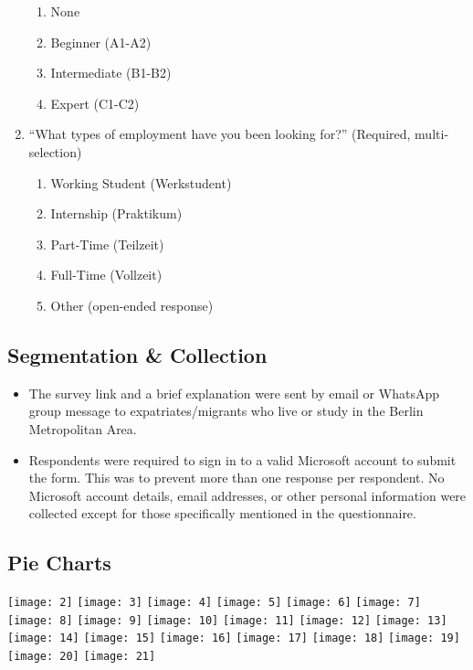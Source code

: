 \begin{enumerate}
\begin{enumerate}
		\item None
		\item Beginner (A1-A2)
		\item Intermediate (B1-B2)
		\item Expert (C1-C2)
	\end{enumerate}
	\item “What types of employment have you been looking for?” (Required, multi-selection)
	\begin{enumerate}
		\item Working Student (Werkstudent)
		\item Internship (Praktikum)
		\item Part-Time (Teilzeit)
		\item Full-Time (Vollzeit)
		\item Other (open-ended response)
	\end{enumerate}
\end{enumerate}

\subsection{Segmentation \& Collection}
\begin{itemize}
  \item The survey link and a brief explanation were sent by email or WhatsApp group message to expatriates/migrants who live or study in the Berlin Metropolitan Area.
  \item Respondents were required to sign in to a valid Microsoft account to submit the form. This was to prevent more than one response per respondent. No Microsoft account details, email addresses, or other personal information were collected except for those specifically mentioned in the questionnaire.
\end{itemize}

\subsection{Pie Charts}
\noindent
\centering
\texttt{[image: 2]}
\texttt{[image: 3]}
\texttt{[image: 4]}
\texttt{[image: 5]}
\texttt{[image: 6]}
\texttt{[image: 7]}
\texttt{[image: 8]}
\texttt{[image: 9]}
\texttt{[image: 10]}
\texttt{[image: 11]}
\texttt{[image: 12]}
\texttt{[image: 13]}
\texttt{[image: 14]}
\texttt{[image: 15]}
\texttt{[image: 16]}
\texttt{[image: 17]}
\texttt{[image: 18]}
\texttt{[image: 19]}
\texttt{[image: 20]}
\texttt{[image: 21]}

\justifying
\clearpage